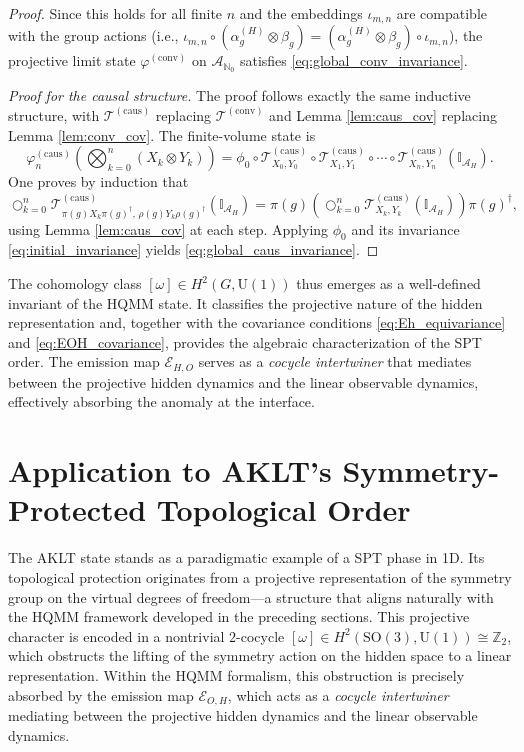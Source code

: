 \documentclass[12pt,a4paper]{article}
\begin{document}
\begin{proof}
Since this holds for all finite \(n\) and the embeddings \(\iota_{m,n}\) are compatible with the group actions (i.e., \(\iota_{m,n} \circ (\alpha_g^{(H)} \otimes \beta_g) = (\alpha_g^{(H)} \otimes \beta_g) \circ \iota_{m,n}\)), the projective limit state \(\varphi^{(\text{conv})}\) on \(\mathcal{A}_{\mathbb{N}_0}\) satisfies \eqref{eq:global_conv_invariance}.

\noindent\textit{Proof for the causal structure.} The proof follows exactly the same inductive structure, with \(\mathcal{T}^{(\text{caus})}\) replacing \(\mathcal{T}^{(\text{conv})}\) and Lemma \ref{lem:caus_cov} replacing Lemma \ref{lem:conv_cov}. The finite-volume state is
\[
\varphi_n^{(\text{caus})}\!\left( \bigotimes_{k=0}^n (X_k \otimes Y_k) \right) = \phi_0 \circ \mathcal{T}_{X_0,Y_0}^{(\text{caus})} \circ \mathcal{T}_{X_1,Y_1}^{(\text{caus})} \circ \cdots \circ \mathcal{T}_{X_n,Y_n}^{(\text{caus})}(\mathbb{I}_{\mathcal{A}_H}).
\]
One proves by induction that
\[
\bigcirc_{k=0}^n \mathcal{T}_{\pi(g) X_k \pi(g)^\dagger, \, \rho(g) Y_k \rho(g)^\dagger}^{(\text{caus})}(\mathbb{I}_{\mathcal{A}_H})
= \pi(g) \left( \bigcirc_{k=0}^n \mathcal{T}_{X_k,Y_k}^{(\text{caus})}(\mathbb{I}_{\mathcal{A}_H}) \right) \pi(g)^\dagger,
\]
using Lemma \ref{lem:caus_cov} at each step. Applying \(\phi_0\) and its invariance \eqref{eq:initial_invariance} yields \eqref{eq:global_caus_invariance}.
\end{proof}

The cohomology class \([\omega] \in H^2(G, \mathrm{U}(1))\) thus emerges as a well-defined invariant of the HQMM state. It classifies the projective nature of the hidden representation and, together with the covariance conditions \eqref{eq:Eh_equivariance} and \eqref{eq:EOH_covariance}, provides the algebraic characterization of the SPT order. The emission map \(\mathcal{E}_{H,O}\) serves as a \textit{cocycle intertwiner} that mediates between the projective hidden dynamics and the linear observable dynamics, effectively absorbing the anomaly at the interface.

 \section{Application to AKLT's Symmetry-Protected Topological Order}\label{Sect_AKLT}
The AKLT state \cite{AKLT1987} stands as a paradigmatic example of a  SPT  phase in 1D. Its topological protection originates from a projective representation of the symmetry group on the virtual degrees of freedom—a structure that aligns naturally with the HQMM framework developed in the preceding sections. This projective character is encoded in a nontrivial $2$-cocycle $[\omega] \in H^2(\mathrm{SO}(3), \mathrm{U}(1)) \cong \mathbb{Z}_2$, which obstructs the lifting of the symmetry action on the hidden space to a linear representation. Within the HQMM formalism, this obstruction is precisely absorbed by the emission map $\mathcal{E}_{O,H}$, which acts as a \textit{cocycle intertwiner} mediating between the projective hidden dynamics and the linear observable dynamics.
\end{document}
